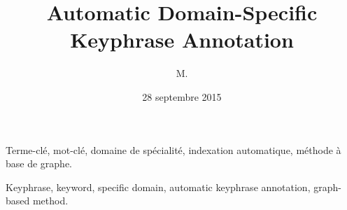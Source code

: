 \documentclass[
  11pt,             %
  french,           %
  greyCover,        %
  fancyChapter,     %
  fancyPart,        %
]{these-LUNAM_mod}
\title{Automatic Domain-Specific Keyphrase Annotation}
\author{M.}{Adrien}{Bougouin}
\date{28 septembre 2015}
\theoremstyle{remark}
\begin{document}
  \begin{resume}\justify\scriptsize
    
  \end{resume}

  \begin{motscles}\scriptsize
     Terme-clé, mot-clé, domaine de spécialité, indexation automatique, méthode
     à base de graphe.
  \end{motscles}

  \begin{abstract}\justify\scriptsize
    
  \end{abstract}

  \begin{keywords}\scriptsize
     Keyphrase, keyword, specific domain, automatic keyphrase annotation,
     graph-based method.
  \end{keywords}

  \maketitle


%  
%  

  \tableofcontents
  \listoftables
  \listoffigures
  \listofalgorithms

  

  \backmatter

  
  

  \printindex
\end{document}
